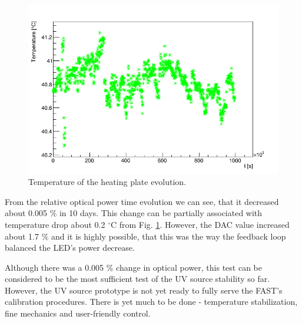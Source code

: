 \begin{figure}[H]
 \centering
 \includegraphics[scale=0.5]{./pictures/LastTemp.png}
 \caption{Temperature of the heating plate evolution.}
 \label{Long test temperatures}
\end{figure}

From the relative optical power time evolution we can see, that it decreased about 0.005 $\%$ in 10 days. This change can be partially associated with temperature drop about 0.2 $^\circ$C from Fig. \ref{Long test temperatures}. However, the DAC value increased about 1.7 $\%$ and it is highly possible, that this was the way the feedback loop balanced the LED's power decrease.

\par 
 
Although there was a 0.005 $\%$ change in optical power, this test can be considered to be the most sufficient test of the UV source stability so far. However, the UV source prototype is not yet ready to fully serve the FAST's calibration procedures. There is yet much to be done - temperature stabilization, fine mechanics and user-friendly control.





